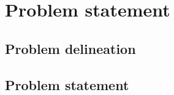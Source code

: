 \chapter{Problem statement}\label{ch:problem-statement}

\section{Problem delineation}\label{sec:problem-delineation}

\section{Problem statement}\label{sec:problem-statement}
